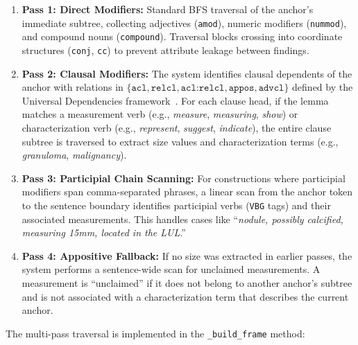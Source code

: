 \documentclass[12pt]{article}
\begin{document}
\begin{enumerate}
    \item \textbf{Pass 1: Direct Modifiers:} Standard BFS traversal of the anchor's immediate subtree, collecting adjectives (\texttt{amod}), numeric modifiers (\texttt{nummod}), and compound nouns (\texttt{compound}). Traversal blocks crossing into coordinate structures (\texttt{conj}, \texttt{cc}) to prevent attribute leakage between findings.
    
    \item \textbf{Pass 2: Clausal Modifiers:} The system identifies clausal dependents of the anchor with relations in $\{\texttt{acl}, \texttt{relcl}, \texttt{acl:relcl}, \texttt{appos}, \texttt{advcl}\}$ defined by the Universal Dependencies framework~\cite{nivre2016universaldependencies}. For each clause head, if the lemma matches a measurement verb (e.g., \textit{measure}, \textit{measuring}, \textit{show}) or characterization verb (e.g., \textit{represent}, \textit{suggest}, \textit{indicate}), the entire clause subtree is traversed to extract size values and characterization terms (e.g., \textit{granuloma}, \textit{malignancy}).
    
    \item \textbf{Pass 3: Participial Chain Scanning:} For constructions where participial modifiers span comma-separated phrases, a linear scan from the anchor token to the sentence boundary identifies participial verbs (\texttt{VBG} tags) and their associated measurements. This handles cases like ``\textit{nodule, possibly calcified, measuring 15mm, located in the LUL}.''
    
    \item \textbf{Pass 4: Appositive Fallback:} If no size was extracted in earlier passes, the system performs a sentence-wide scan for unclaimed measurements. A measurement is ``unclaimed'' if it does not belong to another anchor's subtree and is not associated with a characterization term that describes the current anchor.
\end{enumerate}

The multi-pass traversal is implemented in the \texttt{\_build\_frame} method:
\end{document}
